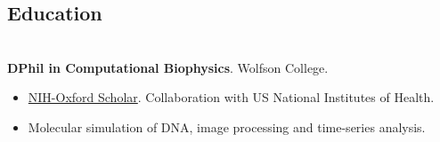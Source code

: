 \documentclass[a4paper, margin]{res}
\begin{document}
 
\begin{sloppypar}
 
 




\begin{resume} 
\setlength{\parskip}{1.00ex}
\setlength{\parindent}{0pt}
 
\section{Education} 
\\
\textbf{DPhil in Computational Biophysics}. Wolfson College.

\begin{itemize}
    \item \href{http://oxcam.gpp.nih.gov/}{NIH-Oxford Scholar}. Collaboration with US National Institutes of Health.
    \item Molecular simulation of DNA, image processing and time-series analysis. 
\end{itemize}



\end{resume}
\end{sloppypar}
\end{document}
